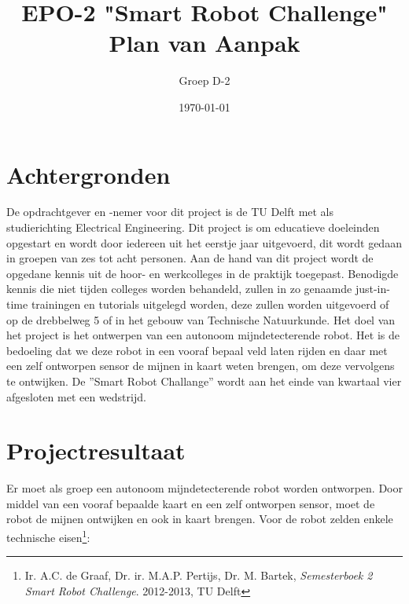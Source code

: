\documentclass[11pt]{article}
\begin{document}
\begin{titlepage}
\title{\textbf{EPO-2 "Smart Robot Challenge"} \\\textbf{Plan van Aanpak}}
\author{Groep D-2}
\date{\today}
\clearpage\maketitle
\thispagestyle{empty}
\end{titlepage}

\thispagestyle{empty}
\setcounter{page}{0}
\tableofcontents
\clearpage

\newpage
\section{Achtergronden}
De opdrachtgever en -nemer voor dit project is de TU Delft met als studierichting Electrical Engineering. Dit project is om educatieve doeleinden opgestart en wordt door iedereen uit het eerstje jaar uitgevoerd, dit wordt gedaan in groepen van zes tot acht personen.  Aan de hand van dit project wordt de opgedane kennis uit de hoor- en werkcolleges in de praktijk toegepast. Benodigde kennis die niet tijden colleges worden behandeld, zullen in zo genaamde just-in-time trainingen en tutorials uitgelegd worden, deze zullen worden uitgevoerd of op de drebbelweg  5 of in het gebouw van Technische Natuurkunde.
Het doel van het project is het ontwerpen van een autonoom mijndetecterende robot. Het is de bedoeling dat we deze robot in een vooraf bepaal veld laten rijden en daar met een zelf ontworpen sensor de mijnen in kaart weten brengen, om deze vervolgens te ontwijken. De ”Smart Robot Challange” wordt aan het einde van kwartaal vier afgesloten met een wedstrijd.

\section{Projectresultaat}
Er moet als groep een autonoom mijndetecterende robot worden ontworpen. Door middel van een vooraf bepaalde kaart en een zelf ontworpen sensor, moet de robot de mijnen ontwijken en ook in kaart brengen. Voor de robot zelden enkele technische eisen\footnote{Ir. A.C. de Graaf, Dr. ir. M.A.P. Pertijs, Dr. M. Bartek, \textit{Semesterboek 2 Smart Robot Challenge}. 2012-2013, TU Delft}:
\end{document}
